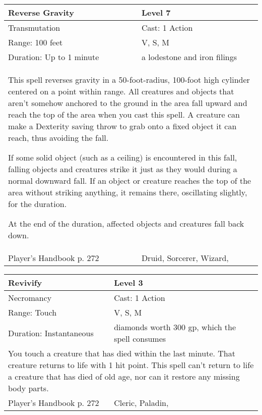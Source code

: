 \documentclass[11pt]{report}
\begin{document}
\begin{table}[H]
	\begin{tabular}{||p{6cm}|p{6cm}||}
		\hline\hline
		\bf{Reverse Gravity} & Level 7\\ \hline
		Transmutation & Cast: 1 Action\\ \hline
		Range: 100 feet & V, S, M\\ \hline
		Duration: Up to 1 minute & a lodestone and iron filings\\ \hline
		\multicolumn{2}{||p{12cm}||}{This spell reverses gravity in a 50-foot-radius, 100-foot high cylinder centered on a point within range.
All creatures and objects that aren’t somehow anchored to the ground in the area fall upward and reach the top of the area when you cast this spell. A creature can make a Dexterity saving throw to grab onto a fixed object it can reach, thus avoiding the fall.

If some solid object (such as a ceiling) is encountered in this fall, falling objects and creatures strike it just as they would during a normal downward fall. If an object or creature reaches the top of the area without striking anything, it remains there, oscillating slightly, for the duration.

At the end of the duration, affected objects and creatures fall back down.}\\ \hline
Player's Handbook p. 272 & Druid, Sorcerer, Wizard, \\ \hline\hline
	\end{tabular}
\end{table}

\begin{table}[H]
	\begin{tabular}{||p{6cm}|p{6cm}||}
		\hline\hline
		\bf{Revivify} & Level 3\\ \hline
		Necromancy & Cast: 1 Action\\ \hline
		Range: Touch & V, S, M\\ \hline
		Duration: Instantaneous & diamonds worth 300 gp, which the spell consumes\\ \hline
		\multicolumn{2}{||p{12cm}||}{You touch a creature that has died within the last minute. That creature returns to life with 1 hit point. This spell can’t return to life a creature that has died of old age, nor can it restore any missing body parts.}\\ \hline
Player's Handbook p. 272 & Cleric, Paladin, \\ \hline\hline
	\end{tabular}
\end{table}
\end{document}
